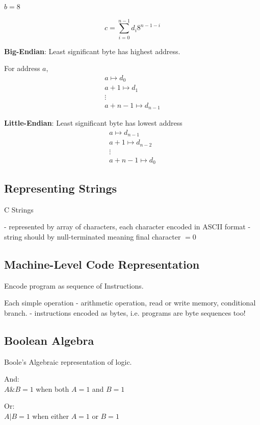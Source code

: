 \documentclass[10pt]{amsart}
\begin{document}
\begin{multicols*}{2}
$b = 8$

\begin{equation}
c = \sum_{i=0}^{n-1} d_i 8^{n-1 -i}
\end{equation}

\textbf{Big-Endian}: Least significant byte has highest address.

For address $a$, 
\[
\begin{gathered}
	a \mapsto d_0 \\
	a+1 \mapsto d_1 \\
\vdots \\
a+n-1 \mapsto d_{n-1}
\end{gathered}
\]

\textbf{Little-Endian}: Least significant byte has lowest address
\[
\begin{gathered}
a \mapsto d_{n-1}  \\
a+1 \mapsto d_{n-2} \\
\vdots \\
a+n -1 \mapsto d_0
\end{gathered}
\]

\subsection{Representing Strings}

C Strings

- represented by array of characters, each character encoded in ASCII format 
- string should by null-terminated meaning final character $=0$

\subsection{Machine-Level Code Representation}

Encode program as sequence of Instructions. 

Each simple operation
- arithmetic operation, read or write memory, conditional branch.
- instructions encoded as bytes, 
i.e. programs are byte sequences too!

\subsection{Boolean Algebra}

Boole's Algebraic representation of logic.

And: \\
$A \& B = 1$ when both $A=1$ and $B=1$

Or: \\
$A | B = 1$ when either $A=1$ or $B=1$


\end{multicols*}
\end{document}
